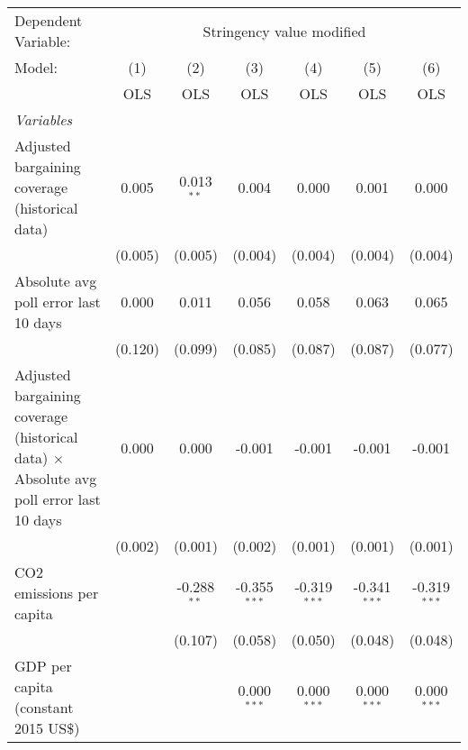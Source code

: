 
\begingroup
\centering
\begin{tabular}{lcccccc}
   \toprule
   Dependent Variable: & \multicolumn{6}{c}{Stringency value modified}\\
   Model:                                                                                        & (1)     & (2)           & (3)            & (4)            & (5)            & (6)\\  
                                                                                                 &  OLS    & OLS           & OLS            & OLS            & OLS            & OLS\\  
   \midrule
   \emph{Variables}\\
   Adjusted bargaining coverage (historical data)                                                & 0.005   & 0.013$^{**}$  & 0.004          & 0.000          & 0.001          & 0.000\\   
                                                                                                 & (0.005) & (0.005)       & (0.004)        & (0.004)        & (0.004)        & (0.004)\\   
   Absolute avg poll error last 10 days                                                          & 0.000   & 0.011         & 0.056          & 0.058          & 0.063          & 0.065\\   
                                                                                                 & (0.120) & (0.099)       & (0.085)        & (0.087)        & (0.087)        & (0.077)\\   
   Adjusted bargaining coverage (historical data) $\times$ Absolute avg poll error last 10 days  & 0.000   & 0.000         & -0.001         & -0.001         & -0.001         & -0.001\\   
                                                                                                 & (0.002) & (0.001)       & (0.002)        & (0.001)        & (0.001)        & (0.001)\\   
   CO2 emissions per capita                                                                      &         & -0.288$^{**}$ & -0.355$^{***}$ & -0.319$^{***}$ & -0.341$^{***}$ & -0.319$^{***}$\\   
                                                                                                 &         & (0.107)       & (0.058)        & (0.050)        & (0.048)        & (0.048)\\   
   GDP per capita (constant 2015 US\$)                                                           &         &               & 0.000$^{***}$  & 0.000$^{***}$  & 0.000$^{***}$  & 0.000$^{***}$\\   

\end{tabular}
